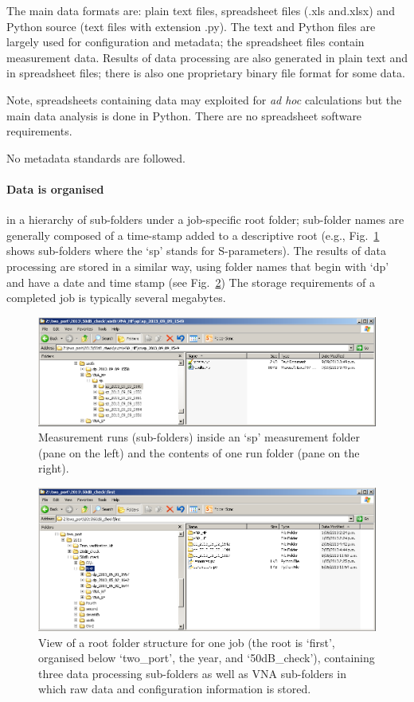 The main data formats are: plain text files, spreadsheet files (.xls and.xlsx) and Python source (text files with extension .py). The text and Python files are largely used for configuration and metadata; the spreadsheet files contain measurement data. Results of data processing are also generated in plain text and in spreadsheet files; there is also one proprietary binary file format for some data. 

Note, spreadsheets containing data may exploited for \textit{ad hoc} calculations but the main data analysis is done in Python. There are no spreadsheet software requirements.

No metadata standards are followed. 

\paragraph{Data is organised} in a hierarchy of sub-folders under a job-specific root folder; sub-folder names are generally composed of a time-stamp added to a descriptive root (e.g., Fig.~\ref{fig:runs} shows sub-folders where the `sp' stands for S-parameters). The results of data processing are stored in a similar way, using folder names that begin
with `dp' and have a date and time stamp (see Fig.~\ref{fig:folders}) The storage requirements of a completed job is typically several megabytes.

\begin{figure}[ht]
 \centering
  \includegraphics[width=0.8\linewidth]{pictures/filesystem_vna_runs.png}
  \caption{Measurement runs (sub-folders) inside an `sp' measurement folder (pane on the left) and the contents of one run folder (pane on the right).}
  \label{fig:runs}
\end{figure}

\begin{figure}[ht]
 \centering
  \includegraphics[width=0.8\linewidth]{pictures/filesystem_runs.png}
  \caption{View of a root folder structure for one job (the root is `first', organised below `two\_port', the year, and `50dB\_check'), containing three data processing sub-folders as well as VNA sub-folders in which raw data and configuration information is stored.}
  \label{fig:folders}
\end{figure}

